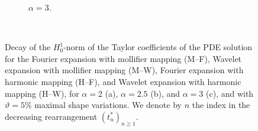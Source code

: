 \begin{figure}
\begin{subfigure}[l]{0.5\textwidth}
		\caption{$\alpha=3$.}
	\end{subfigure}
	\begin{minipage}[r]{0.1\textwidth}
		\,
	\end{minipage}
	\begin{minipage}[r]{0.38\textwidth}
		\caption{Decay of the $H_0^1$-norm of the Taylor coefficients of the PDE solution for the Fourier expansion with mollifier mapping (M--F), Wavelet expansion with mollifier mapping (M--W), Fourier expansion with harmonic mapping (H--F), and Wavelet expansion with harmonic mapping (H--W), for $\alpha = 2$ (a), $\alpha=2.5$ (b), and $\alpha=3$ (c), and with $\vartheta=5\%$ maximal shape variations. We denote by $n$ the index in the decreasing rearrangement $(t^*_n)_{n \geq 1}$.\reprintpermissionfootnote}
		\label{fig:threeresults}
	\end{minipage}
\end{figure}

